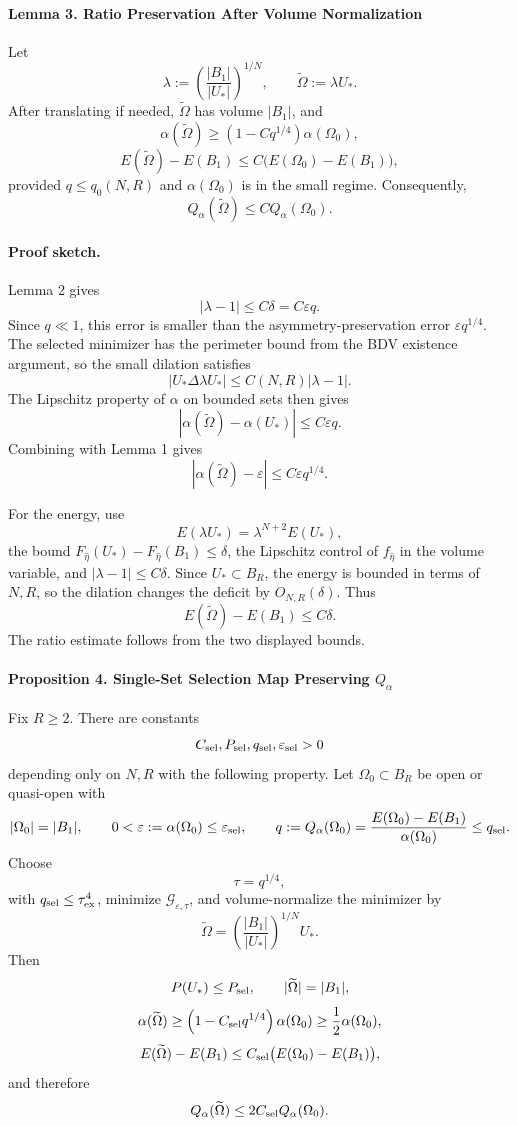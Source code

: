 \documentclass[11pt]{amsart}
\theoremstyle{definition}
\begin{document}
\paragraph{Lemma 3. Ratio Preservation After Volume Normalization}

Let
\[
\lambda:=\left(\frac{|B_1|}{|U_*|}\right)^{1/N},
\qquad
\widetilde\Omega:=\lambda U_*.
\]
After translating if needed, \(\widetilde\Omega\) has volume \(|B_1|\), and
\[
\alpha(\widetilde\Omega)
\ge
\left(1-Cq^{1/4}\right)\alpha(\Omega_0),
\]
\[
E(\widetilde\Omega)-E(B_1)
\le
C\big(E(\Omega_0)-E(B_1)\big),
\]
provided \(q\le q_0(N,R)\) and \(\alpha(\Omega_0)\) is in the small regime.
Consequently,
\[
Q_\alpha(\widetilde\Omega)
\le
C Q_\alpha(\Omega_0).
\]

\paragraph{Proof sketch.}
Lemma 2 gives
\[
|\lambda-1|\le C\delta=C\varepsilon q.
\]
Since \(q\ll1\), this error is smaller than the asymmetry-preservation error
\(\varepsilon q^{1/4}\). The selected minimizer has the perimeter bound from
the BDV existence argument, so the small dilation satisfies
\[
|U_*\Delta \lambda U_*|
\le C(N,R)|\lambda-1|.
\]
The Lipschitz property of \(\alpha\) on bounded sets then gives
\[
|\alpha(\widetilde\Omega)-\alpha(U_*)|
\le C\varepsilon q.
\]
Combining with Lemma 1 gives
\[
|\alpha(\widetilde\Omega)-\varepsilon|
\le C\varepsilon q^{1/4}.
\]

For the energy, use
\[
E(\lambda U_*)=\lambda^{N+2}E(U_*),
\]
the bound \(F_{\hat\eta}(U_*)-F_{\hat\eta}(B_1)\le\delta\), the Lipschitz
control of \(f_{\hat\eta}\) in the volume variable, and
\(|\lambda-1|\le C\delta\). Since \(U_*\subset B_R\), the energy is bounded in
terms of \(N,R\), so the dilation changes the deficit by \(O_{N,R}(\delta)\).
Thus
\[
E(\widetilde\Omega)-E(B_1)\le C\delta.
\]
The ratio estimate follows from the two displayed bounds.

\paragraph{Proposition 4. Single-Set Selection Map Preserving \(Q_\alpha\)}

Fix \(R\ge2\). There are constants
\[
C_{\rm sel},P_{\rm sel},q_{\rm sel},\varepsilon_{\rm sel}>0
\]
depending only on \(N,R\) with the following property. Let
\(\Omega_0\subset B_R\) be open or quasi-open with
\[
|\Omega_0|=|B_1|,
\qquad
0<\varepsilon:=\alpha(\Omega_0)\le\varepsilon_{\rm sel},
\qquad
q:=Q_\alpha(\Omega_0)=\frac{E(\Omega_0)-E(B_1)}{\alpha(\Omega_0)}
\le q_{\rm sel}.
\]
Choose
\[
\tau=q^{1/4},
\]
with \(q_{\rm sel}\le\tau_{\rm ex}^4\), minimize
\(\mathcal G_{\varepsilon,\tau}\), and volume-normalize the minimizer by
\[
\widetilde\Omega
=
\left(\frac{|B_1|}{|U_*|}\right)^{1/N}U_*.
\]
Then
\[
P(U_*)\le P_{\rm sel},
\qquad
|\widetilde\Omega|=|B_1|,
\]
\[
\alpha(\widetilde\Omega)
\ge
\left(1-C_{\rm sel}q^{1/4}\right)\alpha(\Omega_0)
\ge
\frac12\alpha(\Omega_0),
\]
\[
E(\widetilde\Omega)-E(B_1)
\le
C_{\rm sel}\bigl(E(\Omega_0)-E(B_1)\bigr),
\]
and therefore
\[
Q_\alpha(\widetilde\Omega)
\le
2C_{\rm sel}Q_\alpha(\Omega_0).
\]
\end{document}
